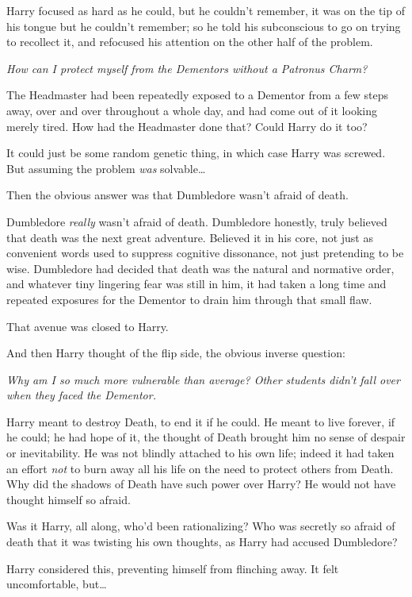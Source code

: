 Harry focused as hard as he could, but he couldn't remember, it was on the tip 
of his tongue but he couldn't remember; so he told his subconscious to go on 
trying to recollect it, and refocused his attention on the other half of the 
problem.

\emph{How can I protect myself from the Dementors without a Patronus Charm?}

The Headmaster had been repeatedly exposed to a Dementor from a few steps away, 
over and over throughout a whole day, and had come out of it looking merely 
tired. How had the Headmaster done that? Could Harry do it too?

It could just be some random genetic thing, in which case Harry was screwed. 
But assuming the problem \emph{was} solvable{\ldots}

Then the obvious answer was that Dumbledore wasn't afraid of death.

Dumbledore \emph{really} wasn't afraid of death. Dumbledore honestly, truly 
believed that death was the next great adventure. Believed it in his core, not 
just as convenient words used to suppress cognitive dissonance, not just 
pretending to be wise. Dumbledore had decided that death was the natural and 
normative order, and whatever tiny lingering fear was still in him, it had 
taken a long time and repeated exposures for the Dementor to drain him through 
that small flaw.

That avenue was closed to Harry.

And then Harry thought of the flip side, the obvious inverse question:

\emph{Why am I so much more vulnerable than average? Other students didn't fall 
over when they faced the Dementor.}

Harry meant to destroy Death, to end it if he could. He meant to live forever, 
if he could; he had hope of it, the thought of Death brought him no sense of 
despair or inevitability. He was not blindly attached to his own life; indeed 
it had taken an effort \emph{not} to burn away all his life on the need to 
protect others from Death. Why did the shadows of Death have such power over 
Harry? He would not have thought himself so afraid.

Was it Harry, all along, who'd been rationalizing? Who was secretly so afraid 
of death that it was twisting his own thoughts, as Harry had accused Dumbledore?

Harry considered this, preventing himself from flinching away. It felt 
uncomfortable, but{\ldots}


